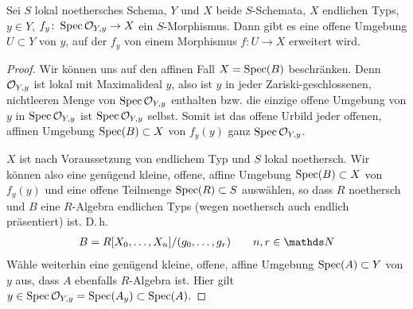 \documentclass[german, bibliography=totoc]{scrreprt}
\renewcommand*{\optcite}[2][]{}
\begin{document}
\begin{Lemma}\label{thm:morphismuserweiterung}
  \optcite[Exercise 3.2.4]{liu}
  Sei $S$ lokal noethersches Schema,
  $Y$ und $X$ beide $S$-Schemata,
  $X$ endlichen Typs,
  $y\in Y$,
  $f_y\colon \operatorname{Spec}\mathcal{O}_{Y,y}\to X$ ein $S$-Morphismus.
  Dann gibt es eine offene Umgebung $U\subset Y$ von $y$, auf der
  $f_y$ von einem Morphismus $f\colon U\to X$ erweitert wird.
  \begin{proof}
    Wir können uns auf den affinen Fall $X=\operatorname{Spec}(B)$ beschränken.
    Denn $\mathcal{O}_{Y,y}$ ist lokal mit Maximalideal $y$, also ist $y$ in
    jeder Zariski-geschlossenen, nichtleeren Menge von $\operatorname{Spec}\mathcal{O}_{Y,y}$
    enthalten bzw. die einzige offene Umgebung von $y$ in
    $\operatorname{Spec}\mathcal{O}_{Y,y}$ ist $\operatorname{Spec}\mathcal{O}_{Y,y}$ selbst.
    Somit ist das offene Urbild jeder offenen, affinen Umgebung
    $\operatorname{Spec}(B)\subset X$ von $f_y(y)$ ganz $\operatorname{Spec}\mathcal{O}_{Y,y}$.

    $X$ ist nach Voraussetzung von endlichem Typ und $S$ lokal
    noethersch.
    Wir können also eine genügend kleine, offene, affine Umgebung
    $\operatorname{Spec}(B)\subset X$ von $f_y(y)$ und eine offene Teilmenge
    $\operatorname{Spec}(R)\subset S$ auswählen,
    so dass $R$ noethersch und $B$ eine $R$-Algebra endlichen Typs
    (wegen noethersch auch endlich präsentiert) ist. D.\,h.
    \begin{gather*}
      B=R[X_0,\dotsc, X_n]/(g_0,\dotsc, g_r)\qquad n,r\in\N
    \end{gather*}
    Wähle weiterhin eine genügend kleine, offene, affine Umgebung
    $\operatorname{Spec}(A)\subset Y$ von $y$ aus, dass $A$ ebenfalls $R$-Algebra ist.
    Hier gilt $y\in\operatorname{Spec}\mathcal{O}_{Y,y}=\operatorname{Spec}(A_y)\subset\operatorname{Spec}(A)$.
    

\end{proof}
\end{Lemma}
\end{document}
